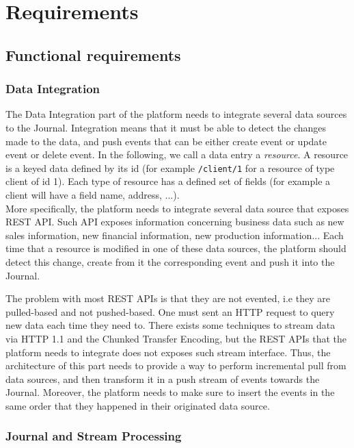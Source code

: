 \chapter{Requirements}

\section{Functional requirements}

\subsection{Data Integration}

The Data Integration part of the platform needs to integrate several data sources to the Journal. Integration means that it must be able 
to detect the changes made to the data, and push events that can be either create event or update event or delete event.
In the following, we call a data entry a \textit{resource}. A resource is a keyed data defined by its id (for example \verb|/client/1| for a
resource of type client of id 1). Each type of resource has a defined set of fields (for example a client
will have a field name, address, ...).
\\

More specifically, the platform needs to integrate several data source that exposes REST API. Such API exposes information
concerning business data such as new sales information, new financial information, new production information...
Each time that a resource is modified in one of these data sources, the platform should detect this change, create from it
the corresponding event and push it into the Journal.

The problem with most REST APIs is that they are not evented, i.e they are pulled-based and not pushed-based. 
One must sent an HTTP request to query new data each time they need to. There exists some techniques to stream data via HTTP 1.1 and the 
Chunked Transfer Encoding, but the REST APIs that the platform needs to integrate does not exposes such stream interface. 
Thus, the architecture of this part needs to provide a way to perform incremental pull from data sources, and then transform
it in a push stream of events towards the Journal. Moreover, the platform needs to make sure to insert the events in the same
order that they happened in their originated data source.


\subsection{Journal and Stream Processing}

